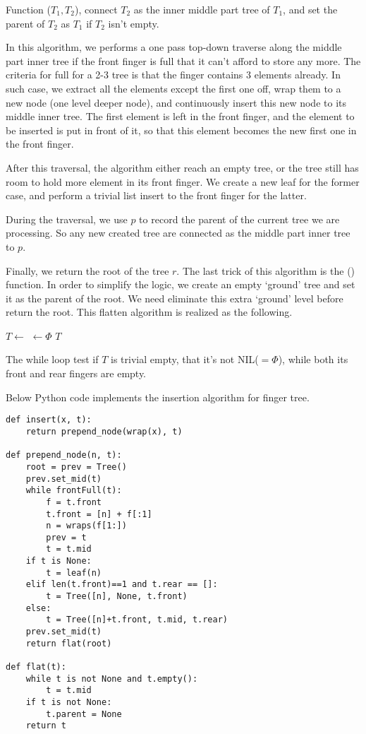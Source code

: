 \documentclass[UTF8]{article}
\begin{document}
Function ($T_1, T_2$), connect $T_2$ as the inner middle part tree of
$T_1$, and set the parent of $T_2$ as $T_1$ if $T_2$ isn't empty.

In this algorithm, we performs a one pass top-down traverse along the middle part inner tree
if the front finger is full that it can't afford to store any more. The criteria for full
for a 2-3 tree is that the finger contains 3 elements already. In such case, we
extract all the elements except the first one off, wrap them to a new node (one level deeper node),
and continuously insert this new node to its middle inner tree. The first element is left
in the front finger, and the element to be inserted is put in front of it, so that this
element becomes the new first one in the front finger.

After this traversal, the algorithm either reach an empty tree, or the tree still has room
to hold more element in its front finger. We create a new leaf for the former case, and
perform a trivial list insert to the front finger for the latter.

During the traversal, we use $p$ to record the parent of the current tree we are processing.
So any new created tree are connected as the middle part inner tree to $p$.

Finally, we return the root of the tree $r$. The last trick of this algorithm is the ()
function. In order to simplify the logic, we create an empty `ground' tree and set
it as the parent of the root. We need eliminate this extra `ground' level before return the
root. This flatten algorithm is realized as the following.

\begin{algorithmic}
    \State $T \gets$ 
  \EndWhile
    \State {} $\gets \Phi$
  \EndIf
  \State \Return $T$
\EndFunction
\end{algorithmic}

The while loop test if $T$ is trivial empty, that it's not NIL($=\Phi$), while both its front
and rear fingers are empty.

Below Python code implements the insertion algorithm for finger tree.

\lstset{language=Python}
\begin{lstlisting}
def insert(x, t):
    return prepend_node(wrap(x), t)

def prepend_node(n, t):
    root = prev = Tree()
    prev.set_mid(t)
    while frontFull(t):
        f = t.front
        t.front = [n] + f[:1]
        n = wraps(f[1:])
        prev = t
        t = t.mid
    if t is None:
        t = leaf(n)
    elif len(t.front)==1 and t.rear == []:
        t = Tree([n], None, t.front)
    else:
        t = Tree([n]+t.front, t.mid, t.rear)
    prev.set_mid(t)
    return flat(root)

def flat(t):
    while t is not None and t.empty():
        t = t.mid
    if t is not None:
        t.parent = None
    return t
\end{lstlisting}
\end{document}
